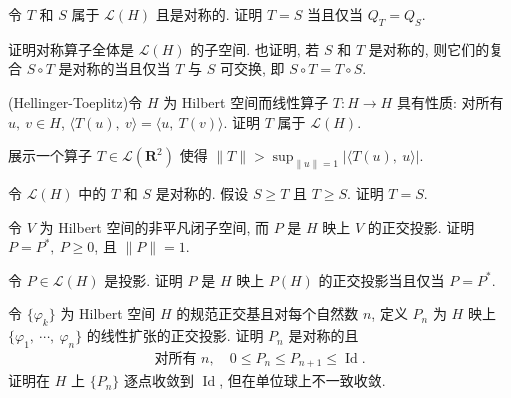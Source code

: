\documentclass[../../main.tex]{subfiles}
\begin{document}
\begin{exercise}\label{exercise:ch16-28}
令 $T$ 和 $S$ 属于 $\mathcal{L}(H)$ 且是对称的. 证明 $T=S$ 当且仅当 $Q_{T}=Q_{S}$.
\end{exercise}

\begin{exercise}\label{exercise:ch16-29}
证明对称算子全体是 $\mathcal{L}(H)$ 的子空间. 也证明, 若 $S$ 和 $T$ 是对称的, 则它们的复合 $S\circ T$ 是对称的当且仅当 $T$ 与 $S$ 可交换, 即 $S\circ T=T\circ S$.
\end{exercise}

\begin{exercise}\label{exercise:ch16-30}
(Hellinger-Toeplitz)令 $H$ 为 Hilbert 空间而线性算子 $T:H\to H$ 具有性质: 对所有 $u,\ v\in H$, $\langle T(u),\ v\rangle=\langle u,\ T(v)\rangle$. 证明 $T$ 属于 $\mathcal{L}(H)$.
\end{exercise}

\begin{exercise}\label{exercise:ch16-31}
展示一个算子 $T\in\mathcal{L}(\mathbf{R}^{2})$ 使得 $\|T\|>\sup_{\|u\|=1}|\langle T(u),\ u\rangle|$.
\end{exercise}

\begin{exercise}\label{exercise:ch16-32}
令 $\mathcal{L}(H)$ 中的 $T$ 和 $S$ 是对称的. 假设 $S\geqslant T$ 且 $T\geqslant S$. 证明 $T=S$.
\end{exercise}

\begin{exercise}\label{exercise:ch16-33}
令 $V$ 为 Hilbert 空间的非平凡闭子空间, 而 $P$ 是 $H$ 映上 $V$ 的正交投影. 证明 $P=P^{*},\ P\geqslant 0$, 且 $\|P\|=1$.
\end{exercise}

\begin{exercise}\label{exercise:ch16-34}
令 $P\in\mathcal{L}(H)$ 是投影. 证明 $P$ 是 $H$ 映上 $P(H)$ 的正交投影当且仅当 $P=P^{*}$.
\end{exercise}

\begin{exercise}\label{exercise:ch16-35}
令 $\{\varphi_{k}\}$ 为 Hilbert 空间 $H$ 的规范正交基且对每个自然数 $n$, 定义 $P_{n}$ 为 $H$ 映上 $\{\varphi_{1},\ \cdots,\ \varphi_{n}\}$ 的线性扩张的正交投影. 证明 $P_{n}$ 是对称的且
\begin{align*}
\text{对所有 }n,\quad 0\leqslant P_{n}\leqslant P_{n+1}\leqslant\operatorname{Id}.
\end{align*}
证明在 $H$ 上 $\{P_{n}\}$ 逐点收敛到 $\operatorname{Id}$, 但在单位球上不一致收敛.
\end{exercise}
\end{document}
